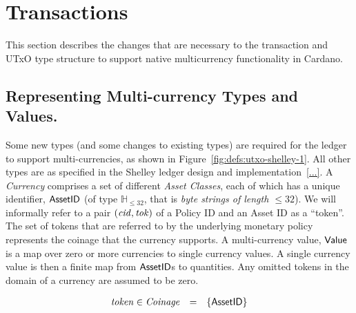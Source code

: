 \section{Transactions}
\label{sec:transactions}

This section describes the changes that are necessary to the transaction and
UTxO type structure to support native multicurrency functionality
in Cardano.

\subsection*{Representing Multi-currency Types and Values.}
Some new types (and some changes to existing types) are required for
the ledger to support multi-currencies, as shown in Figure~\ref{fig:defs:utxo-shelley-1}.
All other types are as specified in the Shelley ledger design and implementation~\ref{...}.
A \emph{Currency} comprises a set of different \emph{Asset Classes}, each of which has
a unique identifier, $\mathsf{AssetID}$  (of type $\mathbb{H}_{\leq 32}$, that is \emph{byte strings of length $\leq 32$}). We will informally refer to a pair $(\mathit{cid}, \mathit{tok})$ of a Policy ID and an Asset ID as a ``token''.
The set of tokens that are referred to by the underlying monetary policy represents the coinage that the currency supports.  A multi-currency value, $\mathsf{Value}$ is a map over zero or more currencies
to single currency values.  A single currency value is then a finite map from
$\mathsf{AssetID}$s to quantities.  Any omitted tokens in the domain of a currency are assumed to be zero.

$$
 \begin{array}{lcl}
   \mathit{token} \in \mathit{Coinage} &=& \{ \mathsf{AssetID} \}
\end{array}
$$




